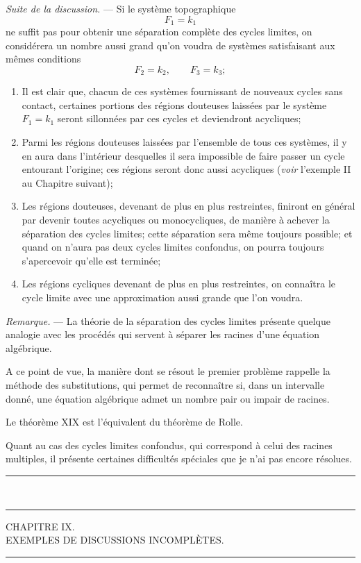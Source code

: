 \documentclass[11pt]{article}
\newcommand{\ornament}{\begin{center}\rule{2.5em}{0.4pt}\,\raisebox{0.1ex}{\tiny$\bullet\bullet\bullet$}\,\rule{2.5em}{0.4pt}\end{center}}
\newcommand{\shortline}{\begin{center}\rule{3.5em}{0.4pt}\end{center}}
\begin{document}
\emph{Suite de la discussion.} --- Si le système topographique
\[
F_1=k_1
\]
ne suffit pas pour obtenir une séparation complète des cycles limites, on considérera un nombre aussi grand qu’on voudra de systèmes satisfaisant aux mêmes conditions
\[
F_2=k_2,
\qquad
F_3=k_3;
\]
\begin{enumerate}[label=\arabic*\textsuperscript{o}, leftmargin=3em]
\item Il est clair que, chacun de ces systèmes fournissant de nouveaux cycles sans contact, certaines portions des régions douteuses laissées par le système $F_1=k_1$ seront sillonnées par ces cycles et deviendront acycliques;
\item Parmi les régions douteuses laissées par l’ensemble de tous ces systèmes, il y en aura dans l’intérieur desquelles il sera impossible de faire passer un cycle entourant l’origine; ces régions seront donc aussi acycliques (\emph{voir} l’exemple II au Chapitre suivant);
\item Les régions douteuses, devenant de plus en plus restreintes, finiront en général par devenir toutes acycliques ou monocycliques, de manière à achever la séparation des cycles limites; cette séparation sera même toujours possible; et quand on n’aura pas deux cycles limites confondus, on pourra toujours s’apercevoir qu’elle est terminée;
\item Les régions cycliques devenant de plus en plus restreintes, on connaîtra le cycle limite avec une approximation aussi grande que l’on voudra.
\end{enumerate}

\emph{Remarque.} --- La théorie de la séparation des cycles limites présente quelque analogie avec les procédés qui servent à séparer les racines d’une équation algébrique.

A ce point de vue, la manière dont se résout le premier problème rappelle la méthode des substitutions, qui permet de reconnaître si, dans un intervalle donné, une équation algébrique admet un nombre pair ou impair de racines.

Le théorème XIX est l’équivalent du théorème de Rolle.

Quant au cas des cycles limites confondus, qui correspond à celui des racines multiples, il présente certaines difficultés spéciales que je n’ai pas encore résolues.

\ornament

\begin{center}
{\Large CHAPITRE IX.}\\[0.4em]
{\small EXEMPLES DE DISCUSSIONS INCOMPLÈTES.}
\end{center}
\shortline
\end{document}
